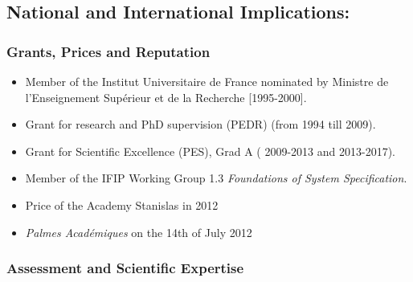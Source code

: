 \documentclass[ 12pt]{article}
\begin{document}
\subsection{National and International Implications:}


\subsubsection{Grants, Prices and Reputation}

\begin{itemize}
\item Member of the Institut Universitaire
de France nominated by   Ministre de l'Enseignement Sup\'erieur et de la Recherche [1995-2000].
\item  Grant for research and PhD supervision (PEDR) (from 1994  till  2009).
\item  Grant for Scientific Excellence (PES), Grad A  ( 2009-2013  and  2013-2017).
\item Member of the IFIP Working Group  1.3  \textit{Foundations of System Specification}.
\item Price of the Academy Stanislas in 2012

\item \textit{Palmes Acad\'emiques} on the  14th of  July  2012

\end{itemize}


\subsubsection{Assessment and Scientific Expertise} 
\end{document}
